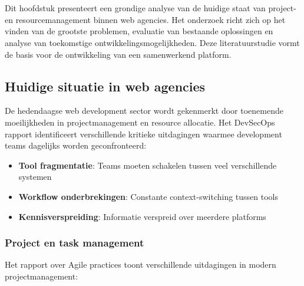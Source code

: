 \chapter{}
\label{ch:stand-van-zaken}

Dit hoofdstuk presenteert een grondige analyse van de huidige staat van project- en resourcemanagement binnen web agencies. Het onderzoek richt zich op het vinden van de grootste problemen, evaluatie van bestaande oplossingen en analyse van toekomstige ontwikkelingsmogelijkheden. Deze literatuurstudie vormt de basis voor de ontwikkeling van een samenwerkend platform.

\section{Huidige situatie in web agencies}
\label{sec:huidige-situatie}

De hedendaagse web development sector wordt gekenmerkt door toenemende moeilijkheden in projectmanagement en resource allocatie. Het \textcite{GitLab2023} DevSecOps rapport identificeert verschillende kritieke uitdagingen waarmee development teams dagelijks worden geconfronteerd:

\begin{itemize}
    \item \textbf{Tool fragmentatie}: Teams moeten schakelen tussen veel verschillende systemen
    \item \textbf{Workflow onderbrekingen}: Constante context-switching tussen tools
    \item \textbf{Kennisverspreiding}: Informatie verspreid over meerdere platforms
\end{itemize}

\subsection{Project en task management}
\label{subsec:project-management}

Het \textcite{Atlassian2023} rapport over Agile practices toont verschillende uitdagingen in modern projectmanagement:

